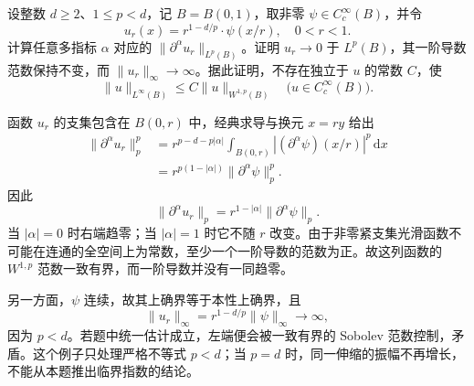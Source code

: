 \begin{optionalexercise}\label{b1:ex:21-scaling-concentration}
设整数 \(d\ge2\)、\(1\le p<d\)，记 \(B=B(0,1)\)，取非零 \(\psi\in C_c^\infty(B)\)，并令
\[
 u_r(x)=r^{1-d/p}\cdot \psi(x/r),\quad 0<r<1.
\]
计算任意多指标 \(\alpha\) 对应的 \(\|\partial^\alpha u_r\|_{L^p(B)}\)。证明 \(u_r\to0\) 于 \(L^p(B)\)，其一阶导数范数保持不变，而 \(\|u_r\|_\infty\to\infty\)。据此证明，不存在独立于 \(u\) 的常数 \(C\)，使
\[
 \|u\|_{L^\infty(B)}
 \le C\|u\|_{W^{1,p}(B)}
 \quad\bigl(u\in C_c^\infty(B)\bigr).
\]
\end{optionalexercise}
\begin{solution}
函数 \(u_r\) 的支集包含在 \(B(0,r)\) 中，经典求导与换元 \(x=ry\) 给出
\[
 \begin{aligned}
 \|\partial^\alpha u_r\|_p^p
 &=r^{p-d-p|\alpha|}\int_{B(0,r)}
       |(\partial^\alpha\psi)(x/r)|^p\,\mathrm dx\\
 &=r^{p(1-|\alpha|)}\|\partial^\alpha\psi\|_p^p.
 \end{aligned}
\]
因此
\[
 \|\partial^\alpha u_r\|_p
 =r^{1-|\alpha|}\|\partial^\alpha\psi\|_p.
\]
当 \(|\alpha|=0\) 时右端趋零；当 \(|\alpha|=1\) 时它不随 \(r\) 改变。由于非零紧支集光滑函数不可能在连通的全空间上为常数，至少一个一阶导数的范数为正。故这列函数的 \(W^{1,p}\) 范数一致有界，而一阶导数并没有一同趋零。

另一方面，\(\psi\) 连续，故其上确界等于本性上确界，且
\[
 \|u_r\|_\infty=r^{1-d/p}\|\psi\|_\infty\longrightarrow\infty,
\]
因为 \(p<d\)。若题中统一估计成立，左端便会被一致有界的 Sobolev 范数控制，矛盾。这个例子只处理严格不等式 \(p<d\)；当 \(p=d\) 时，同一伸缩的振幅不再增长，不能从本题推出临界指数的结论。
\end{solution}

